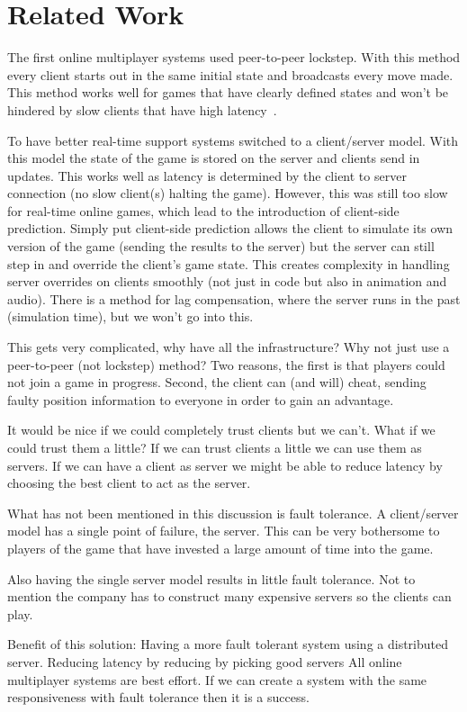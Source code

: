
\section{Related Work}


The first online multiplayer systems used peer-to-peer lockstep. With this method every client starts out in the same initial state and broadcasts every move made. This method works well for games that have clearly defined states and won’t be hindered by slow clients that have high latency~\cite{DOOMfaq}. 

To have better real-time support systems switched to a client/server model. With this model the state of the game is stored on the server and clients send in updates. This works well as latency is determined by the client to server connection (no slow client(s) halting the game). However, this was still too slow for real-time online games, which lead to the introduction of client-side prediction. Simply put client-side prediction allows the client to simulate its own version of the game (sending the results to the server) but the server can still step in and override the client's game state. This creates complexity in handling server overrides on clients smoothly (not just in code but also in animation and audio). There is a method for lag compensation, where the server runs in the past (simulation time), but we won’t go into this.

This gets very complicated, why have all the infrastructure? Why not just use a peer-to-peer (not lockstep) method? Two reasons, the first is that players could not join a game in progress. Second, the client can (and will) cheat, sending faulty position information to everyone in order to gain an advantage.

It would be nice if we could completely trust clients but we can’t. What if we could trust them a little? If we can trust clients a little we can use them as servers. If we can have a client as server we might be able to reduce latency by choosing the best client to act as the server.

What has not been mentioned in this discussion is fault tolerance. A client/server model has a single point of failure, the server. This can be very bothersome to players of the game that have invested a large amount of time into the game. 

Also having the single server model results in little fault tolerance. Not to mention the company has to construct many expensive servers so the clients can play.

Benefit of this solution:
Having a more fault tolerant system using a distributed server. 
Reducing latency by reducing by picking good servers
All online multiplayer systems are best effort. If we can create a system with the same responsiveness with fault tolerance then it is a success.